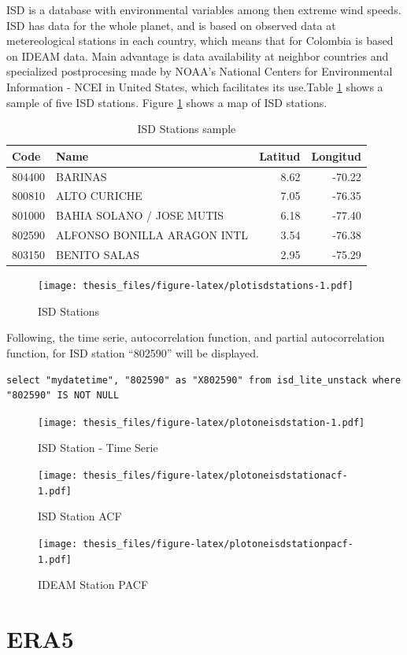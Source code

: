 \documentclass[12pt,twoside]{reedthesis}
\begin{document}
ISD is a database with environmental variables among then extreme wind speeds. ISD has data for the whole planet, and is based on observed data at metereological stations in each country, which means that for Colombia is based on IDEAM data. Main advantage is data availability at neighbor countries and specialized postprocesing made by NOAA's National Centers for Environmental Information - NCEI in United States, which facilitates its use.Table \ref{tab:tableisdstations} shows a sample of five ISD stations. Figure \ref{fig:plotisdstations} shows a map of ISD stations.
\begin{longtable}[t]{llrr}
\caption[ISD Stations]{\label{tab:tableisdstations}ISD Stations sample}\\
\toprule
Code & Name & Latitud & Longitud\\
\midrule
804400 & BARINAS & 8.62 & -70.22\\
800810 & ALTO CURICHE & 7.05 & -76.35\\
801000 & BAHIA SOLANO / JOSE MUTIS & 6.18 & -77.40\\
802590 & ALFONSO BONILLA ARAGON INTL & 3.54 & -76.38\\
803150 & BENITO SALAS & 2.95 & -75.29\\
\bottomrule
\end{longtable}
\begin{figure}
\centering
\texttt{[image: thesis\_files/figure-latex/plotisdstations-1.pdf]}
\caption{\label{fig:plotisdstations}ISD Stations}
\end{figure}
Following, the time serie, autocorrelation function, and partial autocorrelation function, for ISD station ``802590'' will be displayed.
\begin{verbatim}
select "mydatetime", "802590" as "X802590" from isd_lite_unstack where "802590" IS NOT NULL
\end{verbatim}
\begin{figure}
\centering
\texttt{[image: thesis\_files/figure-latex/plotoneisdstation-1.pdf]}
\caption{\label{fig:plotoneisdstation}ISD Station - Time Serie}
\end{figure}
\begin{figure}
\centering
\texttt{[image: thesis\_files/figure-latex/plotoneisdstationacf-1.pdf]}
\caption{\label{fig:plotoneisdstationacf}ISD Station ACF}
\end{figure}
\begin{figure}
\centering
\texttt{[image: thesis\_files/figure-latex/plotoneisdstationpacf-1.pdf]}
\caption{\label{fig:plotoneisdstationpacf}IDEAM Station PACF}
\end{figure}
\hypertarget{era5}{%
\section{ERA5}\label{era5}}
\end{document}
